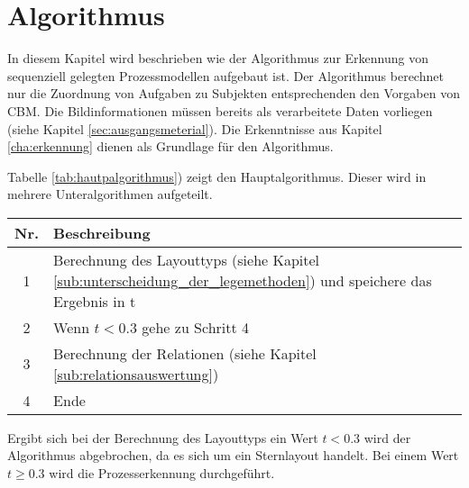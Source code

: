 %
%
% 
% 
% 


\chapter{Algorithmus} 
\label{cap:algorithmus}
In diesem Kapitel wird beschrieben wie der Algorithmus zur Erkennung von sequenziell gelegten Prozessmodellen aufgebaut ist. Der Algorithmus berechnet nur die Zuordnung von Aufgaben zu Subjekten entsprechenden den Vorgaben von CBM. Die Bildinformationen müssen bereits als verarbeitete Daten vorliegen (siehe Kapitel \ref{sec:ausgangsmeterial}). Die Erkenntnisse aus Kapitel \ref{cha:erkennung} dienen als Grundlage für den Algorithmus.

Tabelle \ref{tab:hautpalgorithmus}) zeigt den Hauptalgorithmus. Dieser wird in mehrere Unteralgorithmen aufgeteilt. 

\begin{center}
	\label{tab:hautpalgorithmus}
	\begin{tabularx}
		{1.0\linewidth}{ c X } \textbf{Nr.} & \textbf{Beschreibung} \\
		\hline 1 & Berechnung des Layouttyps (siehe Kapitel  \ref{sub:unterscheidung_der_legemethoden}) und speichere das Ergebnis in t\\
		\hline 2 & Wenn $t < 0.3$ gehe zu Schritt 4 \\
		\hline 3 & Berechnung der Relationen (siehe Kapitel \ref{sub:relationsauswertung})\\
		\hline 4 & Ende
	\end{tabularx}
\end{center}

Ergibt sich bei der Berechnung des Layouttyps ein Wert $t<0.3$ wird der Algorithmus abgebrochen, da es sich um ein Sternlayout handelt. Bei einem Wert $t \geq 0.3$ wird die Prozesserkennung durchgeführt.

